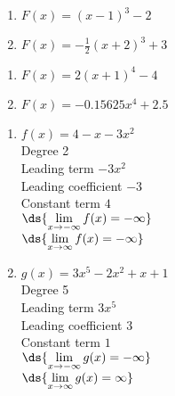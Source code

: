 \documentclass{ximera}
\begin{document}
\begin{multicols}{2}
\begin{enumerate}
\setcounter{enumi}{\value{HW}}

\item  $F(x) = (x-1)^3-2$ 
\item $F(x) = -\frac{1}{2} (x+2)^3+3$

\setcounter{HW}{\value{enumi}}
\end{enumerate}
\end{multicols}

\begin{multicols}{2}
\begin{enumerate}
\setcounter{enumi}{\value{HW}}

\item  $F(x) = 2(x+1)^4-4$ \
\item $F(x) = -0.15625x^4+2.5$

\setcounter{HW}{\value{enumi}}
\end{enumerate}
\end{multicols}


\begin{multicols}{2}
\begin{enumerate}
\setcounter{enumi}{\value{HW}}
\item $f(x) = 4-x-3x^2$ \\
Degree 2 \\
Leading term $-3x^{2}$\\
Leading coefficient $-3$\\
Constant term $4$\\
$\ds{\lim_{x \rightarrow - \infty} f(x)  = -\infty}$ \\
$\ds{\lim_{x \rightarrow  \infty} f(x)  = -\infty}$ \\


\item  $g(x) = 3x^5 - 2x^2 + x + 1$ \\
Degree 5 \\
Leading term $3x^5$\\
Leading coefficient $3$\\
Constant term $1$\\
$\ds{\lim_{x \rightarrow - \infty} g(x)  = -\infty}$ \\
$\ds{\lim_{x \rightarrow \infty} g(x)  = \infty}$ \\



\setcounter{HW}{\value{enumi}}
\end{enumerate}
\end{multicols}
\end{document}
